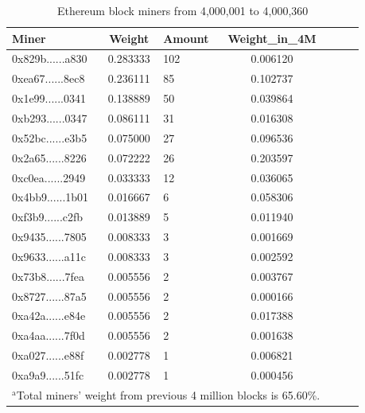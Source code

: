 \documentclass[conference]{IEEEtran}
\begin{document}
\begin{table}[htbp]
\caption{Ethereum block miners from 4,000,001 to 4,000,360}
\begin{center}
\begin{tabular}{lclclcl}
\hline
Miner                                      & Weight   & Amount & Weight\_in\_4M \\
\hline
0x829b......a830 & 0.283333 & 102    & 0.006120       \\
0xea67......8ec8 & 0.236111 & 85     & 0.102737       \\
0x1e99......0341 & 0.138889 & 50     & 0.039864       \\
0xb293......0347 & 0.086111 & 31     & 0.016308       \\
0x52bc......e3b5 & 0.075000 & 27     & 0.096536       \\
0x2a65......8226 & 0.072222 & 26     & 0.203597       \\
0xc0ea......2949 & 0.033333 & 12     & 0.036065       \\
0x4bb9......1b01 & 0.016667 & 6      & 0.058306       \\
0xf3b9......c2fb & 0.013889 & 5      & 0.011940       \\
0x9435......7805 & 0.008333 & 3      & 0.001669       \\
0x9633......a11c & 0.008333 & 3      & 0.002592       \\
0x73b8......7fea & 0.005556 & 2      & 0.003767       \\
0x8727......87a5 & 0.005556 & 2      & 0.000166       \\
0xa42a......e84e & 0.005556 & 2      & 0.017388       \\
0xa4aa......7f0d & 0.005556 & 2      & 0.001638       \\
0xa027......e88f & 0.002778 & 1      & 0.006821       \\
0xa9a9......51fc & 0.002778 & 1      & 0.000456       \\
\hline
\multicolumn{4}{l}{$^{\mathrm{a}}$Total miners' weight from previous 4 million blocks is 65.60\%.}
\end{tabular}
\end{center}
\end{table}
\end{document}
